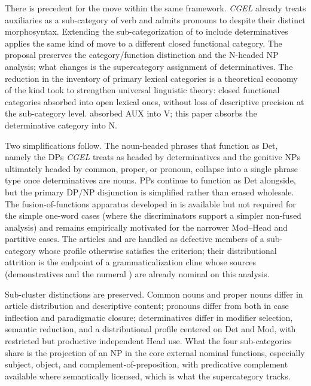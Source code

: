 \documentclass[12pt]{article}
\begin{document}
There is precedent for the move within the same framework. \textit{CGEL} already treats auxiliaries as a sub-category of verb \citep{pullumwilson1977} and admits pronouns to  despite their distinct morphosyntax. Extending the sub-categorization of  to include determinatives applies the same kind of move to a different closed functional category. The proposal preserves the category/function distinction and the N-headed NP analysis; what changes is the supercategory assignment of determinatives. The reduction in the inventory of primary lexical categories is a theoretical economy of the kind \textcite{pullumwilson1977} took to strengthen universal linguistic theory: closed functional categories absorbed into open lexical ones, without loss of descriptive precision at the sub-category level. \textcite{pullumwilson1977} absorbed AUX into V; this paper absorbs the determinative category into N.

Two simplifications follow. The noun-headed phrases that function as Det, namely the DPs \textit{CGEL} treats as headed by determinatives and the genitive NPs ultimately headed by common, proper, or pronoun, collapse into a single phrase type once determinatives are nouns. PPs continue to function as Det alongside, but the primary DP/NP disjunction is simplified rather than erased wholesale. The fusion-of-functions apparatus developed in \textcite{Payne2007} is available but not required for the simple one-word cases (where the discriminators support a simpler non-fused analysis) and remains empirically motivated for the narrower Mod--Head and partitive cases. The articles  and  are handled as defective members of a sub-category whose profile otherwise satisfies the criterion; their distributional attrition is the endpoint of a grammaticalization cline whose sources (demonstratives and the numeral ) are already nominal on this analysis.

Sub-cluster distinctions are preserved. Common nouns and proper nouns differ in article distribution and descriptive content; pronouns differ from both in case inflection and paradigmatic closure; determinatives differ in modifier selection, semantic reduction, and a distributional profile centered on Det and Mod, with restricted but productive independent Head use. What the four sub-categories share is the projection of an NP in the core external nominal functions, especially subject, object, and complement-of-preposition, with predicative complement available where semantically licensed, which is what the supercategory tracks.
\end{document}
